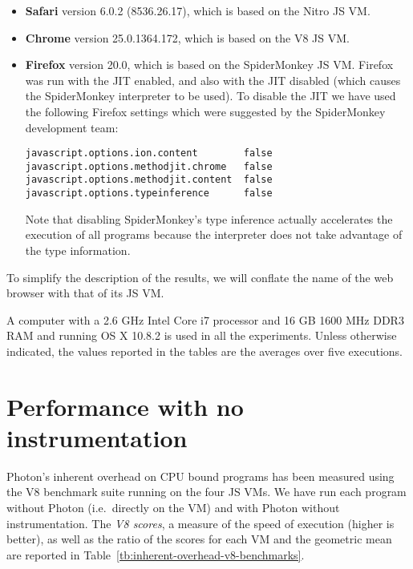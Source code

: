 \begin{itemize}

\item
{\bf Safari} version 6.0.2 (8536.26.17), which is based on the Nitro JS VM.

\item
{\bf Chrome} version 25.0.1364.172, which is based on the V8 JS VM.

\item
{\bf Firefox} version 20.0, which is based on the SpiderMonkey
JS VM.  Firefox was run with the JIT enabled, and also with
the JIT disabled (which causes the SpiderMonkey interpreter to be
used).  To disable the JIT we have used the following Firefox settings
which were suggested by the SpiderMonkey development team:

{\small
\begin{verbatim}
javascript.options.ion.content        false
javascript.options.methodjit.chrome   false 
javascript.options.methodjit.content  false
javascript.options.typeinference      false
\end{verbatim}
}

Note that disabling SpiderMonkey's type inference actually
accelerates the execution of all programs because the interpreter does
not take advantage of the type information.

\end{itemize}

To simplify the description of the results, we will conflate the name of
the web browser with that of its JS VM.

A computer with a 2.6 GHz Intel Core i7 processor and 16 GB 1600 MHz
DDR3 RAM and running OS X 10.8.2 is used in all the experiments.
Unless otherwise indicated, the values reported in the tables are the
averages over five executions.

\section{Performance with no instrumentation}

Photon's inherent overhead on CPU bound programs has been measured
using the V8 benchmark suite running on the four JS VMs.  We
have run each program without Photon (i.e.~directly on the VM) and
with Photon without instrumentation.  The {\it V8 scores}, a measure of
the speed of execution (higher is better), as well as the ratio of the
scores for each VM and the geometric mean are reported in
Table~\ref{tb:inherent-overhead-v8-benchmarks}.

